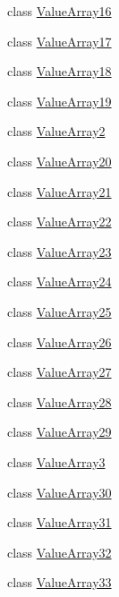 \begin{DoxyCompactItemize}
\item 
class \mbox{\hyperlink{classtesting_1_1internal_1_1_value_array16}{Value\+Array16}}
\item 
class \mbox{\hyperlink{classtesting_1_1internal_1_1_value_array17}{Value\+Array17}}
\item 
class \mbox{\hyperlink{classtesting_1_1internal_1_1_value_array18}{Value\+Array18}}
\item 
class \mbox{\hyperlink{classtesting_1_1internal_1_1_value_array19}{Value\+Array19}}
\item 
class \mbox{\hyperlink{classtesting_1_1internal_1_1_value_array2}{Value\+Array2}}
\item 
class \mbox{\hyperlink{classtesting_1_1internal_1_1_value_array20}{Value\+Array20}}
\item 
class \mbox{\hyperlink{classtesting_1_1internal_1_1_value_array21}{Value\+Array21}}
\item 
class \mbox{\hyperlink{classtesting_1_1internal_1_1_value_array22}{Value\+Array22}}
\item 
class \mbox{\hyperlink{classtesting_1_1internal_1_1_value_array23}{Value\+Array23}}
\item 
class \mbox{\hyperlink{classtesting_1_1internal_1_1_value_array24}{Value\+Array24}}
\item 
class \mbox{\hyperlink{classtesting_1_1internal_1_1_value_array25}{Value\+Array25}}
\item 
class \mbox{\hyperlink{classtesting_1_1internal_1_1_value_array26}{Value\+Array26}}
\item 
class \mbox{\hyperlink{classtesting_1_1internal_1_1_value_array27}{Value\+Array27}}
\item 
class \mbox{\hyperlink{classtesting_1_1internal_1_1_value_array28}{Value\+Array28}}
\item 
class \mbox{\hyperlink{classtesting_1_1internal_1_1_value_array29}{Value\+Array29}}
\item 
class \mbox{\hyperlink{classtesting_1_1internal_1_1_value_array3}{Value\+Array3}}
\item 
class \mbox{\hyperlink{classtesting_1_1internal_1_1_value_array30}{Value\+Array30}}
\item 
class \mbox{\hyperlink{classtesting_1_1internal_1_1_value_array31}{Value\+Array31}}
\item 
class \mbox{\hyperlink{classtesting_1_1internal_1_1_value_array32}{Value\+Array32}}
\item 
class \mbox{\hyperlink{classtesting_1_1internal_1_1_value_array33}{Value\+Array33}}

\end{DoxyCompactItemize}
